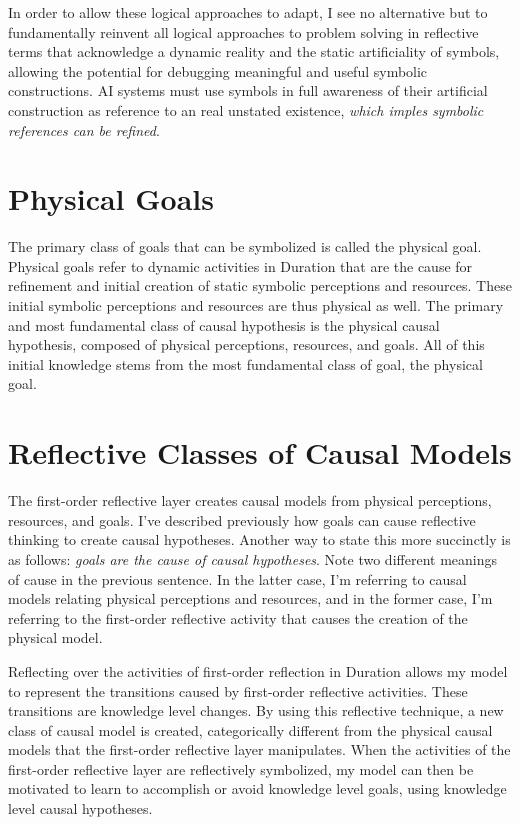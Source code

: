 In order to allow these logical approaches to adapt, I see no
alternative but to fundamentally reinvent all logical approaches to
problem solving in reflective terms that acknowledge a dynamic reality
and the static artificiality of symbols, allowing the potential for
debugging meaningful and useful symbolic constructions.  AI systems
must use symbols in full awareness of their artificial construction as
reference to an real unstated existence, \emph{which imples symbolic
  references can be refined}.

\section{Physical Goals}

The primary class of goals that can be symbolized is called the
physical goal.  Physical goals refer to dynamic activities in Duration
that are the cause for refinement and initial creation of static
symbolic perceptions and resources.  These initial symbolic
perceptions and resources are thus physical as well.  The primary and
most fundamental class of causal hypothesis is the physical causal
hypothesis, composed of physical perceptions, resources, and goals.
All of this initial knowledge stems from the most fundamental class of
goal, the physical goal.

\section{Reflective Classes of Causal Models}

The first-order reflective layer creates causal models from physical
perceptions, resources, and goals.  I've described previously how
goals can cause reflective thinking to create causal hypotheses.
Another way to state this more succinctly is as follows: \emph{goals
  are the cause of causal hypotheses}.  Note two different meanings of
cause in the previous sentence.  In the latter case, I'm referring to
causal models relating physical perceptions and resources, and in the
former case, I'm referring to the first-order reflective activity that
causes the creation of the physical model.

Reflecting over the activities of first-order reflection in Duration
allows my model to represent the transitions caused by first-order
reflective activities.  These transitions are knowledge level changes.
By using this reflective technique, a new class of causal model is
created, categorically different from the physical causal models that
the first-order reflective layer manipulates.  When the activities of
the first-order reflective layer are reflectively symbolized, my model
can then be motivated to learn to accomplish or avoid knowledge level
goals, using knowledge level causal hypotheses.

